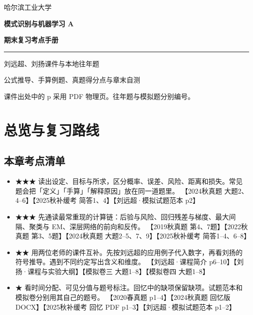 \documentclass[UTF8,a4paper,zihao=-4,fontset=fandol]{ctexrep}
\begin{document}
\begin{titlepage}
\thispagestyle{empty}
\vspace*{.15\textheight}
{\Large\color{muted}哈尔滨工业大学\par}
\vspace{1.2em}
{\Huge\bfseries\color{navy}模式识别与机器学习 A\par}
\vspace{.45em}
{\Huge\bfseries\color{navy}期末复习考点手册\par}
\vspace{1.5em}
{\color{navy}\rule{.77\linewidth}{.9pt}\par}
\vspace{1em}
{\large 刘远超、刘扬课件与本地往年题\par}
{\large 公式推导、手算例题、真题得分点与章末自测\par}
\vfill
{\small 课件出处中的 p 采用 PDF 物理页。往年题与模拟题分别编号。\par}
\end{titlepage}
\renewcommand{\contentsname}{目录}
\tableofcontents
\clearpage
\setcounter{chapter}{-1}

\chapter{总览与复习路线}

\section{本章考点清单}
\begin{itemize}
\item ★★★ 读出设定、目标与所求，区分概率、误差、风险、距离和损失。常见题会把「定义」「手算」「解释原因」放在同一道题里。 【2024秋真题 大题2、4–6】【2025秋补缓考 简答1、4】【刘远超·模拟试题范本 p2】
\item ★★★ 先通读最常重现的计算链：后验与风险、回归残差与梯度、最大间隔、聚类与 EM、深层网络的前向和反传。 【2019秋真题 第4、7题】【2022秋真题 第3、5题】【2024秋真题 大题2–5、7、9】【2025秋补缓考 简答1–4、6–8】
\item ★★ 用两位老师的课件互补。先按刘远超的应用例子代入数字，再看刘扬的符号推导。遇到不同约定写出含义和维度。 【刘远超·课程简介 p6–10】【刘扬·课程与实验大纲】【模拟卷三 大题1–8】【模拟卷四 大题1–8】
\item ★ 看时间分配、可见分值与题号标注。回忆中的缺项保留缺项。试题范本和模拟卷分别用其自己的题号。 【2020春真题 p1–4】【2024秋真题 回忆版 DOCX】【2025秋补缓考 回忆 PDF p1–3】【刘远超·模拟试题范本 p1–2】
\end{itemize}
\end{document}
